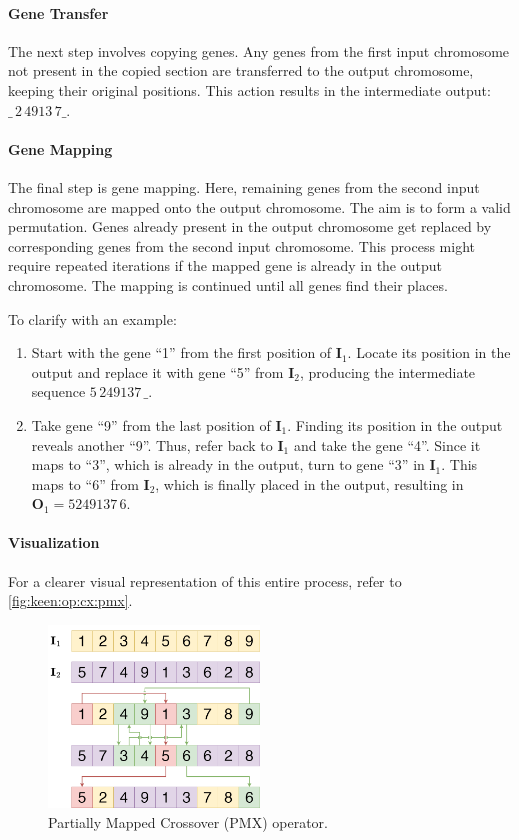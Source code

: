   \paragraph{Gene Transfer}

    The next step involves copying genes. Any genes from the first input 
    chromosome not present in the copied section are transferred to the output 
    chromosome, keeping their original positions. This action results in the 
    intermediate output: \(\_\,2\,4913\,7\_\).

  \paragraph{Gene Mapping}
    The final step is gene mapping. Here, remaining genes from the second input 
    chromosome are mapped onto the output chromosome. The aim is to form a valid 
    permutation. Genes already present in the output chromosome get replaced by 
    corresponding genes from the second input chromosome. This process might 
    require repeated iterations if the mapped gene is already in the output 
    chromosome. The mapping is continued until all genes find their places. 

    To clarify with an example:

    \begin{enumerate}
      \item Start with the gene \enquote{1} from the first position of 
        \(\mathbf{I}_1\). 
        Locate its position in the output and replace it with gene \enquote{5} 
        from \(\mathbf{I}_2\), producing the intermediate sequence 
        \(5\,249137\,\_\).
      \item Take gene \enquote{9} from the last position of \(\mathbf{I}_1\). 
        Finding its position in the output reveals another \enquote{9}. Thus, 
        refer back to \(\mathbf{I}_1\) and take the gene \enquote{4}. Since it 
        maps to \enquote{3}, which is already in the output, turn to gene 
        \enquote{3} in \(\mathbf{I}_1\). This maps to \enquote{6} from 
        \(\mathbf{I}_2\), which is finally placed in the output, resulting in 
        \(\textbf{O}_1 = 5249137\,6\).
    \end{enumerate}

  \paragraph{Visualization}
    For a clearer visual representation of this entire process, refer to \vref{fig:keen:op:cx:pmx}.

    \begin{figure}[ht!]
      \centering
      \includegraphics[width=0.5\textwidth]{img/keen/PMX.png}
      \caption{Partially Mapped Crossover (PMX) operator.}
      \label{fig:keen:op:cx:pmx}
    \end{figure}
